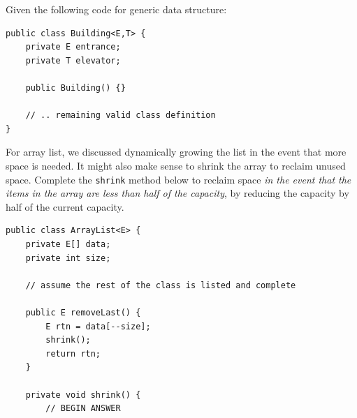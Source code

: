 \documentclass[11pt]{exam}
\begin{document}
\begin{questions}

\question Given the following code for generic data structure:
\begin{lstlisting}
public class Building<E,T> {
    private E entrance;
    private T elevator;

    public Building() {}

    // .. remaining valid class definition 	 
}	
\end{lstlisting}

\newpage
\question[15] For array list, we discussed dynamically growing the list in the event that more space is needed.   It might also make sense to shrink the array to reclaim unused space.   Complete the {\tt shrink} method below to reclaim space {\it in the event that the items in the array are less than half of the capacity}, by reducing the capacity by half of the current capacity.

\begin{verbatim}
public class ArrayList<E> {
    private E[] data;
    private int size;

    // assume the rest of the class is listed and complete

    public E removeLast() {
        E rtn = data[--size];
        shrink();
        return rtn;
    }
	
    private void shrink() {
        // BEGIN ANSWER
		
	
	
	
	
	
	


	
	
	
	

\end{verbatim}
\end{questions}
\end{document}
